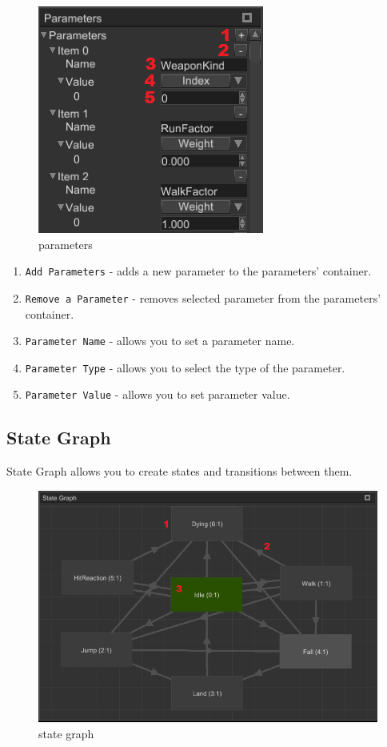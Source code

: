 \documentclass[
]{book}
\providecommand{\tightlist}{%
  \setlength{\itemsep}{0pt}\setlength{\parskip}{0pt}}
\theoremstyle{definition}
\theoremstyle{definition}
\theoremstyle{definition}
\theoremstyle{definition}
\theoremstyle{remark}
\begin{document}
\begin{figure}
\centering
\includegraphics{images/animation/absm_parameters.png}
\caption{parameters}
\end{figure}

\begin{enumerate}
\def\labelenumi{\arabic{enumi}.}
\tightlist
\item
  \texttt{Add\ Parameters} - adds a new parameter to the parameters' container.
\item
  \texttt{Remove\ a\ Parameter} - removes selected parameter from the parameters' container.
\item
  \texttt{Parameter\ Name} - allows you to set a parameter name.
\item
  \texttt{Parameter\ Type} - allows you to select the type of the parameter.
\item
  \texttt{Parameter\ Value} - allows you to set parameter value.
\end{enumerate}

\subsection{State Graph}\label{state-graph}

State Graph allows you to create states and transitions between them.

\begin{figure}
\centering
\includegraphics{images/animation/absm_state_graph.png}
\caption{state graph}
\end{figure}
\end{document}
